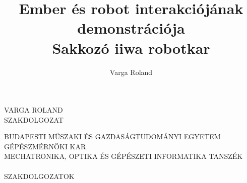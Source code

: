 \documentclass[12pt,a4paper,twoside]{article}
\begin{document}
\author{Varga Roland}
\title{Ember és robot interakciójának demonstrációja\\
		Sakkozó iiwa robotkar}
\newpage\thispagestyle{empty}
\begin{center}
     VARGA ROLAND\\
     SZAKDOLGOZAT
\end{center}
\newpage\thispagestyle{empty}
\begin{center}
     BUDAPESTI MŰSZAKI ÉS GAZDASÁGTUDOMÁNYI EGYETEM\\
     GÉPÉSZMÉRNÖKI KAR\\
     MECHATRONIKA, OPTIKA ÉS GÉPÉSZETI INFORMATIKA TANSZÉK\\[1ex]
     \\[1ex]
     SZAKDOLGOZATOK
\end{center}
\newpage\thispagestyle{empty}
\end{document}
